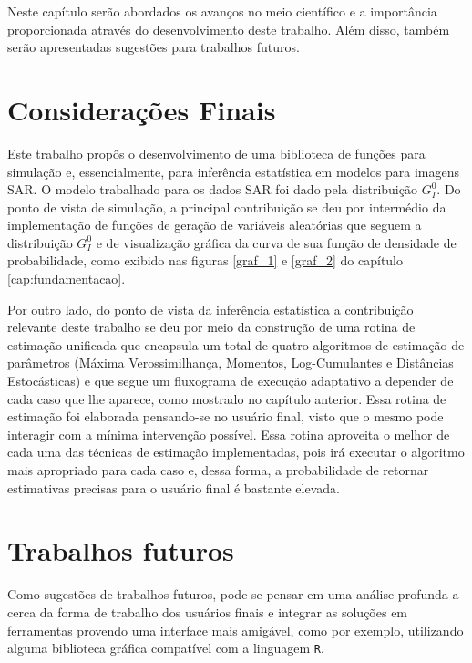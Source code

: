 
Neste capítulo serão abordados os avanços no meio científico e a importância proporcionada através do desenvolvimento deste trabalho. Além disso, também serão apresentadas sugestões para trabalhos futuros.

\section{Considerações Finais}

Este trabalho propôs o desenvolvimento de uma biblioteca de funções para simulação e, essencialmente, para inferência estatística em modelos para imagens SAR. O modelo trabalhado para os dados SAR foi dado pela distribuição $G_I^0$. Do ponto de vista de simulação, a principal contribuição se deu por intermédio da implementação de funções de geração de variáveis aleatórias que seguem a distribuição $G_I^0$ e de visualização gráfica da curva de sua função de densidade de probabilidade, como exibido nas figuras \ref{graf_1} e \ref{graf_2} do capítulo \ref{cap:fundamentacao}.

Por outro lado, do ponto de vista da inferência estatística a contribuição relevante deste trabalho se deu por meio da construção de uma rotina de estimação unificada que encapsula um total de quatro algoritmos de estimação de parâmetros (Máxima Verossimilhança, Momentos, Log-Cumulantes e Distâncias Estocásticas) e que segue um fluxograma de execução adaptativo a depender de cada caso que lhe aparece, como mostrado no capítulo anterior. Essa rotina de estimação foi elaborada pensando-se no usuário final, visto que o mesmo pode interagir com a mínima intervenção possível. Essa rotina aproveita o melhor de cada uma das técnicas de estimação implementadas, pois irá executar o algoritmo mais apropriado para cada caso e, dessa forma, a probabilidade de retornar estimativas precisas para o usuário final é bastante elevada.

\section{Trabalhos futuros}

Como sugestões de trabalhos futuros, pode-se pensar em uma análise profunda a cerca da forma de trabalho dos usuários finais e integrar as soluções em ferramentas provendo uma interface mais amigável, como por exemplo, utilizando alguma biblioteca gráfica compatível com a linguagem \texttt{R}.

